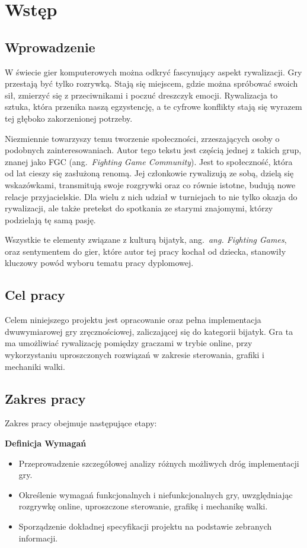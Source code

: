 \chapter{Wstęp}
\section{Wprowadzenie}
W świecie gier komputerowych można odkryć fascynujący aspekt rywalizacji. Gry przestają być tylko rozrywką. Stają się miejscem, gdzie można spróbować swoich sił, zmierzyć się z przeciwnikami i poczuć dreszczyk emocji. Rywalizacja to sztuka, która przenika naszą egzystencję, a te cyfrowe konflikty stają się wyrazem tej głęboko zakorzenionej potrzeby.

Niezmiennie towarzyszy temu tworzenie społeczności, zrzeszających osoby o podobnych zainteresowaniach. Autor tego tekstu jest częścią jednej z takich grup, znanej jako FGC (ang.~\emph{Fighting Game Community}). Jest to społeczność, która od lat cieszy się zasłużoną renomą. Jej członkowie rywalizują ze sobą, dzielą się wskazówkami, transmitują swoje rozgrywki oraz co równie istotne, budują nowe relacje przyjacielskie. Dla wielu z nich udział w turniejach to nie tylko okazja do rywalizacji, ale także pretekst do spotkania ze starymi znajomymi, którzy podzielają tę samą pasję.

Wszystkie te elementy związane z kulturą bijatyk, ang.~\emph{ang. Fighting Games}, oraz sentymentem do gier, które autor tej pracy kochał od dziecka, stanowiły kluczowy powód wyboru tematu pracy dyplomowej.

\section{Cel pracy}
Celem niniejszego projektu jest opracowanie oraz pełna implementacja dwuwymiarowej gry zręcznościowej, zaliczającej się do kategorii bijatyk. Gra ta ma umożliwiać rywalizację pomiędzy graczami w trybie online, przy wykorzystaniu uproszczonych rozwiązań w zakresie sterowania, grafiki i mechaniki walki.

\section{Zakres pracy}
Zakres pracy obejmuje następujące etapy:

\textbf{Definicja Wymagań}
\begin{itemize}
	\item Przeprowadzenie szczegółowej analizy różnych możliwych dróg implementacji gry.
	\item Określenie wymagań funkcjonalnych i niefunkcjonalnych gry, uwzględniając rozgrywkę online, uproszczone sterowanie, grafikę i mechanikę walki.
	\item Sporządzenie dokładnej specyfikacji projektu na podstawie zebranych informacji.
\end{itemize}

